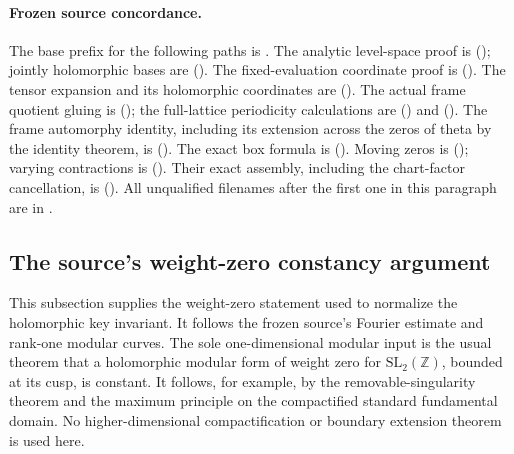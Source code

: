 \paragraph{Frozen source concordance.}
The base prefix for the following paths is
.
The analytic level-space proof is
();
jointly holomorphic bases are
().
The fixed-evaluation coordinate proof is
().
The tensor expansion and its holomorphic coordinates are
().
The actual frame quotient gluing is
();
the full-lattice periodicity calculations are
()
and 
().
The frame automorphy identity, including its extension across the
zeros of theta by the identity theorem, is
().
The exact box formula is
().
Moving zeros is
();
varying contractions is
().
Their exact assembly, including the chart-factor cancellation,
is 
().
All unqualified filenames after the first one in this paragraph
are in .

\subsection{The source's weight-zero constancy argument}
\label{sec:ftb-key-weight-zero}

This subsection supplies the weight-zero statement used to normalize
the holomorphic key invariant.  It follows the frozen source's
Fourier estimate and rank-one modular curves.  The sole
one-dimensional modular input is the usual theorem that a
holomorphic modular form of weight zero for
\(\mathrm{SL}_2(\mathbb Z)\), bounded at its cusp, is constant.
It follows, for example, by the removable-singularity theorem and
the maximum principle on the compactified standard fundamental
domain.  No higher-dimensional compactification or boundary
extension theorem is used here.

